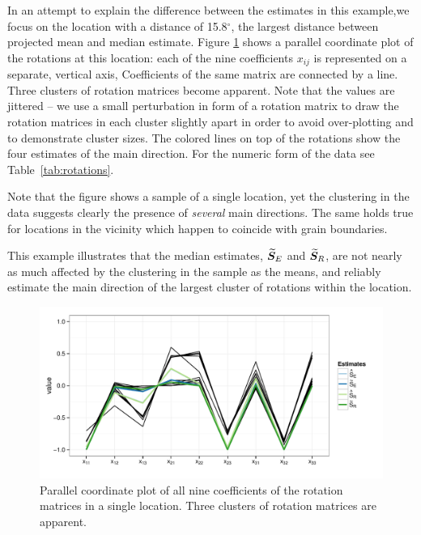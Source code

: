 \noindent In an attempt to explain the difference between the estimates in this example,we focus on the  location with a distance of 15.8$^\circ$, the largest distance between projected mean and median estimate. Figure \ref{fig:pcp} shows a parallel coordinate plot of the rotations at this location: each of the nine coefficients $x_{ij}$ is represented on a separate, vertical axis, Coefficients of the same matrix are connected by a line.  Three clusters of rotation matrices become apparent. Note that the values are jittered -- we use a small perturbation in form of a rotation matrix to draw the rotation matrices in each cluster slightly apart  in order to avoid over-plotting and to demonstrate cluster sizes. The colored lines on top of the rotations show the four estimates of the main direction.  For the numeric form of the data see Table~\ref{tab:rotations}.

\noindent Note that the figure shows a sample of a single location, yet the clustering in the data suggests clearly the presence of \emph{several} main directions. The same holds true for locations in the vicinity which happen to coincide with grain boundaries. 

\noindent This example illustrates that the median estimates, ${\widetilde{\bm S}_E}$  and ${\widetilde{\bm S}_R}$, are not nearly as much affected by the clustering in the sample as the means, and reliably estimate the main direction of the largest cluster of rotations within the location.


\begin{figure}[htbp] %
   \centering
   \includegraphics[width=.7\textwidth]{images/pcp.pdf} 
   \caption{ \label{fig:pcp}Parallel coordinate plot of all nine coefficients of the rotation matrices in a single location. Three clusters of rotation matrices are apparent.  }
\end{figure}



